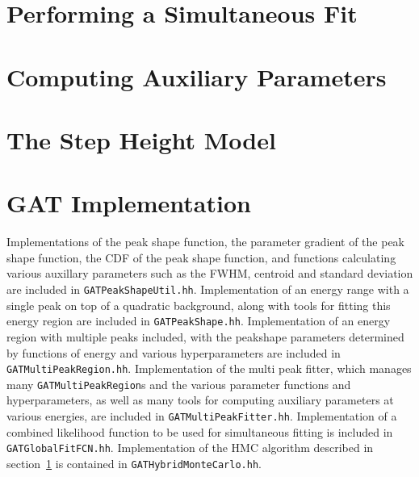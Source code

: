 \documentclass[/main.tex]{subfiles}
\begin{document}
\section{Performing a Simultaneous Fit} \label{sec:fitter}
\section{Computing Auxiliary Parameters}
\section{The Step Height Model} \label{sec:stepheight}

\section{GAT Implementation}
Implementations of the peak shape function, the parameter gradient of the peak shape function, the CDF of the peak shape function, and functions calculating various auxillary parameters such as the FWHM, centroid and standard deviation are included in \texttt{GATPeakShapeUtil.hh}.
Implementation of an energy range with a single peak on top of a quadratic background, along with tools for fitting this energy region are included in \texttt{GATPeakShape.hh}.
Implementation of an energy region with multiple peaks included, with the peakshape parameters determined by functions of energy and various hyperparameters are included in \texttt{GATMultiPeakRegion.hh}.
Implementation of the multi peak fitter, which manages many \texttt{GATMultiPeakRegion}s and the various parameter functions and hyperparameters, as well as many tools for computing auxiliary parameters at various energies, are included in \texttt{GATMultiPeakFitter.hh}.
Implementation of a combined likelihood function to be used for simultaneous fitting is included in \texttt{GATGlobalFitFCN.hh}.
Implementation of the HMC algorithm described in section~\ref{sec:fitter} is contained in \texttt{GATHybridMonteCarlo.hh}.
\\
\end{document}
